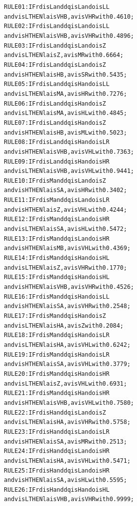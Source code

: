 \documentclass[11pt,twoside]{article}
\begin{document}
\begin{multicols}{2}
\begin{scriptsize}
\begin{alltt}
RULE 01: IF rd is  L and dq is L and o is LL 
    and v is L THEN la is VHB , av is VHR with 0.4610;
RULE 02: IF rd is  L and dq is L and o is LL 
    and v is H THEN la is VHB , av is VHR with 0.4896;
RULE 03: IF rd is  L and dq is L and o is  Z 
    and v is L THEN la is   Z , av is  MR with 0.6664;
RULE 04: IF rd is  L and dq is L and o is  Z 
    and v is H THEN la is  HB , av is  SR with 0.5435;
RULE 05: IF rd is  L and dq is H and o is LL 
    and v is L THEN la is  MA , av is  HR with 0.7276;
RULE 06: IF rd is  L and dq is H and o is  Z 
    and v is L THEN la is  MA , av is  HL with 0.4845;
RULE 07: IF rd is  L and dq is H and o is  Z 
    and v is H THEN la is  HB , av is  ML with 0.5023;
RULE 08: IF rd is  L and dq is H and o is LR 
    and v is H THEN la is VHB , av is VHL with 0.7363;
RULE 09: IF rd is  L and dq is H and o is HR 
    and v is L THEN la is VHB , av is VHL with 0.9441;
RULE 10: IF rd is  M and dq is L and o is  Z 
    and v is H THEN la is  SA , av is  HR with 0.3402;
RULE 11: IF rd is  M and dq is L and o is LR 
    and v is H THEN la is   Z , av is VHL with 0.4244;
RULE 12: IF rd is  M and dq is L and o is HR 
    and v is L THEN la is  SA , av is  HL with 0.5472;
RULE 13: IF rd is  M and dq is L and o is HR 
    and v is H THEN la is  MB , av is VHL with 0.4369;
RULE 14: IF rd is  M and dq is H and o is HL 
    and v is L THEN la is   Z , av is VHR with 0.1770;
RULE 15: IF rd is  M and dq is H and o is HL 
    and v is H THEN la is VHB , av is VHR with 0.4526;
RULE 16: IF rd is  M and dq is H and o is LL 
    and v is H THEN la is  SA , av is VHR with 0.2548;
RULE 17: IF rd is  M and dq is H and o is  Z 
    and v is L THEN la is  HA , av is   Z with 0.2084;
RULE 18: IF rd is  M and dq is H and o is LR 
    and v is L THEN la is  HA , av is VHL with 0.6242;
RULE 19: IF rd is  M and dq is H and o is LR 
    and v is H THEN la is  SA , av is VHL with 0.3779;
RULE 20: IF rd is  M and dq is H and o is HR 
    and v is L THEN la is   Z , av is VHL with 0.6931;
RULE 21: IF rd is  M and dq is H and o is HR 
    and v is H THEN la is VHB , av is VHL with 0.7580;
RULE 22: IF rd is  H and dq is L and o is  Z 
    and v is L THEN la is  HA , av is VHR with 0.5758;
RULE 23: IF rd is  H and dq is L and o is LR 
    and v is H THEN la is  SA , av is  MR with 0.2513;
RULE 24: IF rd is  H and dq is L and o is HR 
    and v is L THEN la is  HA , av is VHL with 0.5471;
RULE 25: IF rd is  H and dq is L and o is HR 
    and v is H THEN la is  SA , av is  HL with 0.5595;
RULE 26: IF rd is  H and dq is H and o is HL 
    and v is L THEN la is VHB , av is VHR with 0.9999;

\end{alltt}
\end{scriptsize}
\end{multicols}
\end{document}

